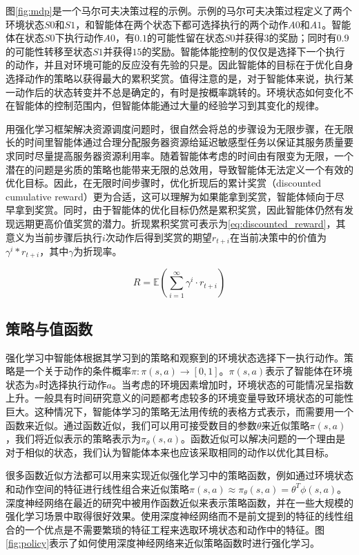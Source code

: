 图\ref{fig:mdp}是一个马尔可夫决策过程的示例。示例的马尔可夫决策过程定义了两个环境状态$S0$和$S1$，和智能体在两个状态下都可选择执行的两个动作$A0$和$A1$。智能体在状态$S0$下执行动作$A0$，有$0.1$的可能性留在状态$S0$并获得$3$的奖励；同时有$0.9$的可能性转移至状态$S1$并获得$15$的奖励。智能体能控制的仅仅是选择下一个执行的动作，并且对环境可能的反应没有先验的只是。因此智能体的目标在于优化自身选择动作的策略以获得最大的累积奖赏。值得注意的是，对于智能体来说，执行某一动作后的状态转变并不总是确定的，有时是按概率跳转的。环境状态如何变化不在智能体的控制范围内，但智能体能通过大量的经验学习到其变化的规律。

用强化学习框架解决资源调度问题时，很自然会将总的步骤设为无限步骤，在无限长的时间里智能体通过合理分配服务器资源给延迟敏感型任务以保证其服务质量要求同时尽量提高服务器资源利用率。随着智能体考虑的时间由有限变为无限，一个潜在的问题是劣质的策略也能带来无限的总效用，导致智能体无法定义一个有效的优化目标。因此，在无限时间步骤时，优化折现后的累计奖赏（discounted cumulative reward）更为合适，这可以理解为如果能拿到奖赏，智能体倾向于尽早拿到奖赏。同时，由于智能体的优化目标仍然是累积奖赏，因此智能体仍然有发现远期更高价值奖赏的潜力。折现累积奖赏可表示为\ref{eq:discounted_reward}，其意义为当前步骤后执行$i$次动作后得到奖赏的期望$r_{t+i}$在当前决策中的价值为$\gamma^i*r_{t+i}$，其中$\gamma$为折现率。

\begin{equation}
  \label{eq:discounted_reward}
    R = \mathbb{E}(\sum_{i=1}^{\infty} {\gamma^{i}} \cdot r_{t+i})
\end{equation}

\subsection{策略与值函数}
强化学习中智能体根据其学习到的策略和观察到的环境状态选择下一执行动作。策略是一个关于动作的条件概率$\pi: \pi(s, a)\rightarrow[0,1]$。$\pi(s, a)$表示了智能体在环境状态为$s$时选择执行动作$a$。当考虑的环境因素增加时，环境状态的可能情况呈指数上升。一般具有时间研究意义的问题都考虑较多的环境变量导致环境状态的可能性巨大。这种情况下，智能体学习的策略无法用传统的表格方式表示，而需要用一个函数来近似\cite{bertsekas1995dynamic}\cite{menache2005basis}。通过函数近似，我们可以用可接受数目的参数$\theta$来近似策略$\pi(s, a)$，我们将近似表示的策略表示为$\pi_\theta(s,a)$。函数近似可以解决问题的一个理由是对于相似的状态，我们认为智能体本来也应该采取相同的动作以优化其目标。

很多函数近似方法都可以用来实现近似强化学习中的策略函数，例如通过环境状态和动作空间的特征进行线性组合来近似策略$\pi(s,a)\approx\pi_\theta(s,a)=\theta^T\phi(s,a)$。 深度神经网络在最近的研究中被用作函数近似来表示策略函数，并在一些大规模的强化学习场景中取得很好效果。使用深度神经网络而不是前文提到的特征的线性组合的一个优点是不需要繁琐的特征工程来选取环境状态和动作中的特征。图\ref{fig:policy}表示了如何使用深度神经网络来近似策略函数时进行强化学习。

